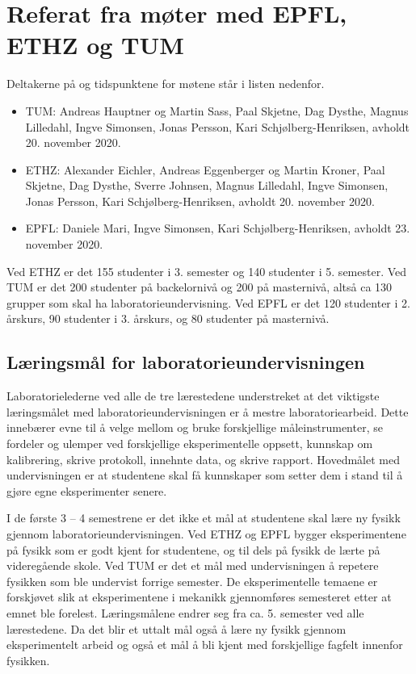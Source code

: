 \documentclass{article}
\begin{document}
\appendix
\section{Referat fra møter med EPFL, ETHZ og TUM}\label{Referat}

Deltakerne på og tidspunktene for møtene står i listen nedenfor.
\begin{itemize}
  \item TUM: Andreas Hauptner og Martin Sass, Paal Skjetne, Dag Dysthe, Magnus Lilledahl, Ingve Simonsen, Jonas Persson, Kari Schjølberg-Henriksen, avholdt 20. november 2020. 
  \item ETHZ: Alexander Eichler, Andreas Eggenberger og Martin Kroner, Paal Skjetne, Dag Dysthe, Sverre Johnsen, Magnus Lilledahl, Ingve Simonsen, Jonas Persson, Kari Schjølberg-Henriksen, avholdt 20. november 2020. 
  \item EPFL: Daniele Mari, Ingve Simonsen, Kari Schjølberg-Henriksen, avholdt 23. november 2020. 
\end{itemize}

Ved ETHZ er det 155 studenter i 3. semester og 140 studenter i 5. semester. Ved TUM er det 200 studenter på backelornivå og 200 på masternivå, altså ca 130 grupper som skal ha laboratorieundervisning. Ved EPFL er det 120 studenter i 2. årskurs, 90 studenter i 3. årskurs, og 80 studenter på masternivå. 

\subsection{Læringsmål for laboratorieundervisningen}
Laboratorielederne ved alle de tre lærestedene understreket at det viktigste læringsmålet med laboratorieundervisningen er å mestre laboratoriearbeid. Dette innebærer evne til å velge mellom og bruke forskjellige måleinstrumenter, se fordeler og ulemper ved forskjellige eksperimentelle oppsett, kunnskap om kalibrering, skrive protokoll, innehnte data, og skrive rapport. Hovedmålet med undervisningen er at studentene skal få kunnskaper som setter dem i stand til å gjøre egne eksperimenter senere. 

I de første 3 – 4 semestrene er det ikke et mål at studentene skal lære ny fysikk gjennom laboratorieundervisningen. Ved ETHZ og EPFL bygger eksperimentene på fysikk som er godt kjent for studentene, og til dels på fysikk de lærte på videregående skole. Ved TUM er det et mål med undervisningen å repetere fysikken som ble undervist forrige semester. De eksperimentelle temaene er forskjøvet slik at eksperimentene i mekanikk gjennomføres semesteret etter at emnet ble forelest. 
Læringsmålene endrer seg fra ca. 5. semester ved alle lærestedene. Da det blir et uttalt mål også å lære ny fysikk gjennom eksperimentelt arbeid og også et mål å bli kjent med forskjellige fagfelt innenfor fysikken. 
\end{document}
